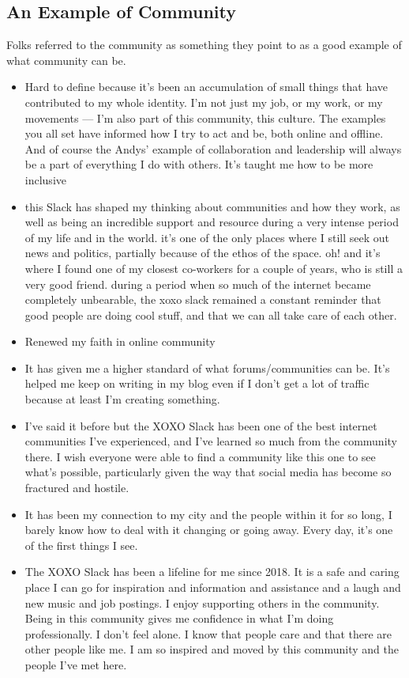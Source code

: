 \documentclass[
]{book}
\providecommand{\tightlist}{%
  \setlength{\itemsep}{0pt}\setlength{\parskip}{0pt}}
\begin{document}
\subsection{An Example of Community}\label{an-example-of-community}

Folks referred to the community as something they point to as a good example of what community can be.

\begin{itemize}
\tightlist
\item
  Hard to define because it's been an accumulation of small things that have contributed to my whole identity. I'm not just my job, or my work, or my movements --- I'm also part of this community, this culture. The examples you all set have informed how I try to act and be, both online and offline. And of course the Andys' example of collaboration and leadership will always be a part of everything I do with others.
  It's taught me how to be more inclusive
\item
  this Slack has shaped my thinking about communities and how they work, as well as being an incredible support and resource during a very intense period of my life and in the world. it's one of the only places where I still seek out news and politics, partially because of the ethos of the space. oh! and it's where I found one of my closest co-workers for a couple of years, who is still a very good friend. during a period when so much of the internet became completely unbearable, the xoxo slack remained a constant reminder that good people are doing cool stuff, and that we can all take care of each other.
\item
  Renewed my faith in online community
\item
  It has given me a higher standard of what forums/communities can be. It's helped me keep on writing in my blog even if I don't get a lot of traffic because at least I'm creating something.
\item
  I've said it before but the XOXO Slack has been one of the best internet communities I've experienced, and I've learned so much from the community there. I wish everyone were able to find a community like this one to see what's possible, particularly given the way that social media has become so fractured and hostile.
\item
  It has been my connection to my city and the people within it for so long, I barely know how to deal with it changing or going away. Every day, it's one of the first things I see.
\item
  The XOXO Slack has been a lifeline for me since 2018. It is a safe and caring place I can go for inspiration and information and assistance and a laugh and new music and job postings. I enjoy supporting others in the community. Being in this community gives me confidence in what I'm doing professionally. I don't feel alone. I know that people care and that there are other people like me. I am so inspired and moved by this community and the people I've met here.
\end{itemize}
\end{document}
